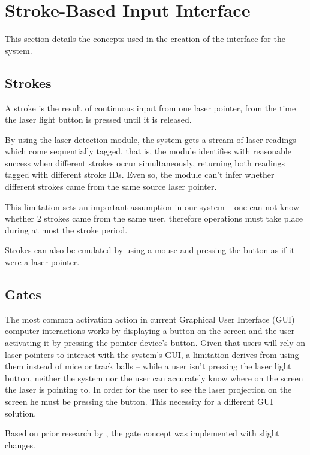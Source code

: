 \section{Stroke-Based Input Interface}

This section details the concepts used in the creation of the interface for the system.

\subsection{Strokes}

A stroke is the result of continuous input from one laser pointer, from the time the laser
light button is pressed until it is released. 

By using the laser detection module, the system gets a stream of laser readings which
come sequentially tagged, that is, the module identifies with reasonable success when different strokes
occur simultaneously, returning both readings tagged with different stroke IDs.
Even so, the module can't infer whether different strokes came from the same source laser pointer.

This limitation sets an important assumption in our system -- one can not know whether 2 strokes came
from the same user, therefore operations must take place during at most the stroke period.

Strokes can also be emulated by using a mouse and pressing
the button as if it were a laser pointer.


\subsection{Gates}

The most common activation action in current Graphical User Interface (GUI) computer interactions works
by displaying a button on the screen and the user activating it by pressing the pointer device's button.
Given that users will rely on laser pointers to interact with the system's GUI, a limitation derives from
using them instead of mice or track balls -- while a user isn't pressing the laser light button,
neither the system nor the user can accurately know where on the screen the laser is pointing to.
In order for the user to see the laser projection on the screen he must be pressing the button.
This necessity  for a different GUI solution.

Based on prior research by \cite{CROSSY}, the gate concept was implemented with slight changes.

